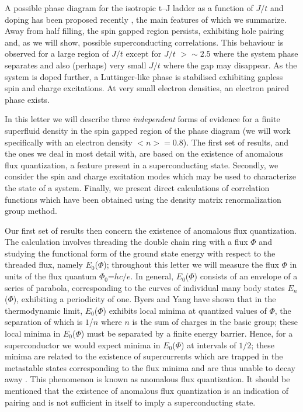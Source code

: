 {A possible phase diagram for the isotropic
t--J ladder as a function of $J/t$ and doping
has been  proposed recently \cite{DP}, the
main features of which we summarize.
Away from half filling,
the spin gapped region persists, exhibiting hole pairing and, as we will show,
  possible
superconducting correlations.
This behaviour is observed for a large region of $J/t$ except for
  $J/t$ $>\sim 2.5$ \cite{tsunetsugu}
  where  the system phase separates and also (perhaps) very small
 $J/t$ where the gap may disappear.
As the system is doped further, a
Luttinger-like phase is stabilised exhibiting gapless spin and charge
excitations. At very small electron densities, an electron paired phase exists.


In this letter  we will describe three {\it independent}
forms of evidence for a finite superfluid density in the spin gapped region
of the phase diagram (we will work specifically with an
electron density $\big <n \big > =0.8$).
The first set of results, and the ones we deal
in most detail with, are based on the existence  of
anomalous flux quantization, a feature present  in a superconducting state.
Secondly,
we consider  the spin and charge excitation modes which may be used to
characterize the
state of a system. Finally, we present direct calculations of correlation
functions
which have been obtained using the density matrix renormalization group method.

Our first set of results then concern
the existence  of anomalous flux quantization.
The calculation involves threading the double chain ring with a flux $\Phi$
and studying the functional form of the   ground
state energy with
respect to the threaded flux, namely  $E_0$($\Phi$); throughout this letter
we will measure the flux $\Phi$
in units of the flux quantum $\Phi_0$=$hc/e$. In general, $E_0$($\Phi$)
consists
of an envelope of a series of parabola, corresponding to the curves of
individual many body states $E_n$($\Phi$), exhibiting a  periodicity of one.
Byers and Yang \cite{byers_yang} have shown that in the thermodynamic limit,
$E_0$($\Phi$)
exhibits local minima at quantized values of  $\Phi$, the separation of which
is
$1$/$n$ where  $n$ is the
sum of charges in the basic group;
these local minima in $E_0$($\Phi$)
must be separated by a finite energy barrier.
 Hence, for
a superconductor we would expect minima in $E_0$($\Phi$) at intervals of
$1/2$;
these minima are related to the existence of
supercurrents which are  trapped in the metastable states corresponding to the
flux minima
and are thus unable to  decay away \cite{Schrieffer}. This phenomenon is
known as anomalous flux quantization.
It should be mentioned that the existence of anomalous flux quantization
is an indication of
pairing and is not sufficient in itself to imply a superconducting state.

}
